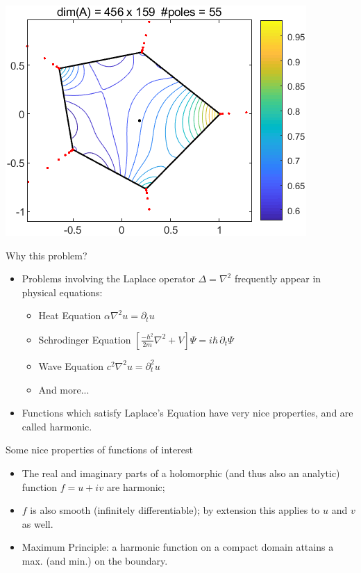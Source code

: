 \documentclass{seminar}
\begin{document}
\begin{slide}
\includegraphics[scale=.4]{./PNG/randpoly1}
\end{slide} %




\begin{slide} %
\large Why this problem?\\

\small
\begin{itemize}
	\item Problems involving the Laplace operator $\Delta={\nabla}^2$ frequently appear in physical equations:
	\begin{itemize}
		\item Heat Equation
		$\alpha {\nabla}^2 u={\partial}_t u$
		\item Schrodinger Equation
		$\left[ \frac{-{\hbar}^2}{2m}{\nabla}^2 + V \right]\Psi=i \hbar \, \partial_t \Psi$
		\item Wave Equation
		$c^2 {\nabla}^2 u={\partial}_t^2 u$
		\item And more...
	\end{itemize}
	\item Functions which satisfy Laplace's Equation have very nice properties, and are called harmonic.
	
\end{itemize}
\end{slide} %




\begin{slide} %
\large Some nice properties of functions of interest \\

\small
\begin{itemize}
	\item The real and imaginary parts of a holomorphic (and thus also an analytic) function $f=u+iv$ are harmonic;
	\item $f$ is also smooth (infinitely differentiable); by extension this applies to $u$ and $v$ as well.
	\item Maximum Principle: a harmonic function on a compact domain attains a max. (and min.) on the boundary.
\end{itemize}
\end{slide} %
\end{document}
